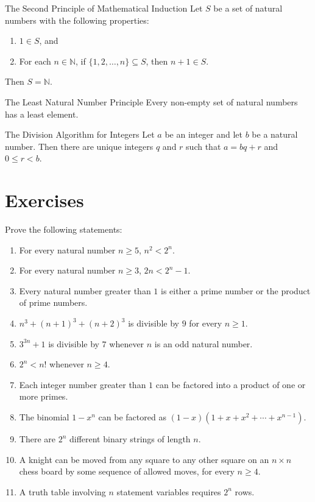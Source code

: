 \documentclass[letterpaper, 10pt]{article}
\theoremstyle{definition}
\theoremstyle{definition}
\newcommand{\thistheoremname}{}
\newtheorem*{genericthm*}{\thistheoremname}
\newenvironment{namedthm*}[1]
	{\renewcommand{\thistheoremname}{#1}%
	\begin{genericthm*}}
	{\end{genericthm*}}
\newcommand{\set}[1]{\{#1\}}
\renewcommand{\ge}{\geqslant}
\renewcommand{\le}{\leqslant}
\begin{document}
\begin{namedthm*}{The Second Principle of Mathematical Induction}\cite{fletcher}
	Let $S$ be a set of natural numbers with the following properties:
	\begin{enumerate}[label=\alph*)]
		\item $1 \in S$, and 
		\item For each $n \in \mathbb{N}$, if $\set{1,2,\ldots,n} \subseteq S$,
			then $n + 1 \in S$.
	\end{enumerate}
	Then $S = \mathbb{N}$.
\end{namedthm*}

\begin{namedthm*}{The Least Natural Number Principle}\cite{fletcher}
	Every non-empty set of natural numbers has a least element.
\end{namedthm*}

\begin{namedthm*}{The Division Algorithm for Integers}\cite{fletcher}
	Let $a$ be an integer and let $b$ be a natural number. Then there are
	unique integers $q$ and $r$ such that $a = bq + r$ and $0 \le r < b$. 
\end{namedthm*}

\section*{Exercises}
Prove the following statements:
\begin{enumerate}
	\item For every natural number $n \ge 5$, $n^2 < 2^n$.
	\item For every natural number $n \ge 3$, $2n < 2^n - 1$.
	\item Every natural number greater than $1$ is either a prime number or the
		product of prime numbers.
	\item $n^3 + (n + 1)^3 + (n + 2)^3$ is divisible by $9$ for every $n \ge 1$.
	\item $3^{3n} + 1$ is divisible by $7$ whenever $n$ is an odd natural
		number.
	\item $2^n < n!$ whenever $n \ge 4$. 
	\item Each integer number greater than $1$ can be factored into a product of
		one or more primes.
	\item The binomial $1 - x^n$ can be factored as $(1-x)(1 + x + x^2 + \cdots
		+ x^{n-1})$.
	\item There are $2^n$ different binary strings of length $n$.
	\item A knight can be moved from any square to any other square on an $n
		\times n$ chess board by some sequence of allowed moves, for every $n
		\ge 4$.
	\item A truth table involving $n$ statement variables requires $2^n$ rows.
\end{enumerate}



\end{document}
